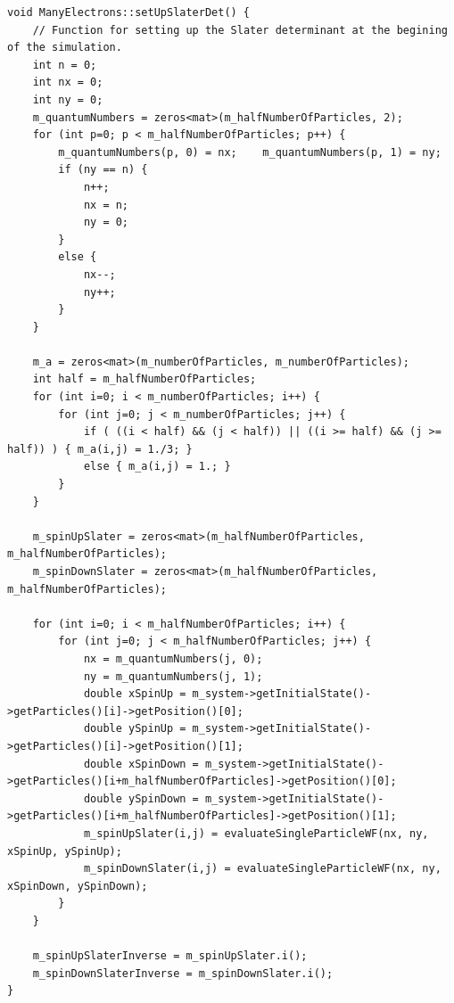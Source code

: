 \documentclass[../main.tex]{subfiles}
\begin{document}
\begin{lstlisting}[title={Setting up the (Split) Slater Determinant in C++}]
void ManyElectrons::setUpSlaterDet() {
    // Function for setting up the Slater determinant at the begining of the simulation.
    int n = 0;
    int nx = 0;
    int ny = 0;
    m_quantumNumbers = zeros<mat>(m_halfNumberOfParticles, 2);
    for (int p=0; p < m_halfNumberOfParticles; p++) {
        m_quantumNumbers(p, 0) = nx;    m_quantumNumbers(p, 1) = ny;
        if (ny == n) {
            n++;
            nx = n;
            ny = 0;
        }
        else {
            nx--;
            ny++;
        }
    }

    m_a = zeros<mat>(m_numberOfParticles, m_numberOfParticles);
    int half = m_halfNumberOfParticles;
    for (int i=0; i < m_numberOfParticles; i++) {
        for (int j=0; j < m_numberOfParticles; j++) {
            if ( ((i < half) && (j < half)) || ((i >= half) && (j >= half)) ) { m_a(i,j) = 1./3; }
            else { m_a(i,j) = 1.; }
        }
    }

    m_spinUpSlater = zeros<mat>(m_halfNumberOfParticles, m_halfNumberOfParticles);
    m_spinDownSlater = zeros<mat>(m_halfNumberOfParticles, m_halfNumberOfParticles);

    for (int i=0; i < m_halfNumberOfParticles; i++) {
        for (int j=0; j < m_halfNumberOfParticles; j++) {
            nx = m_quantumNumbers(j, 0);
            ny = m_quantumNumbers(j, 1);
            double xSpinUp = m_system->getInitialState()->getParticles()[i]->getPosition()[0];
            double ySpinUp = m_system->getInitialState()->getParticles()[i]->getPosition()[1];
            double xSpinDown = m_system->getInitialState()->getParticles()[i+m_halfNumberOfParticles]->getPosition()[0];
            double ySpinDown = m_system->getInitialState()->getParticles()[i+m_halfNumberOfParticles]->getPosition()[1];
            m_spinUpSlater(i,j) = evaluateSingleParticleWF(nx, ny, xSpinUp, ySpinUp);
            m_spinDownSlater(i,j) = evaluateSingleParticleWF(nx, ny, xSpinDown, ySpinDown);
        }
    }

    m_spinUpSlaterInverse = m_spinUpSlater.i();
    m_spinDownSlaterInverse = m_spinDownSlater.i();
}
\end{lstlisting}
\end{document}
